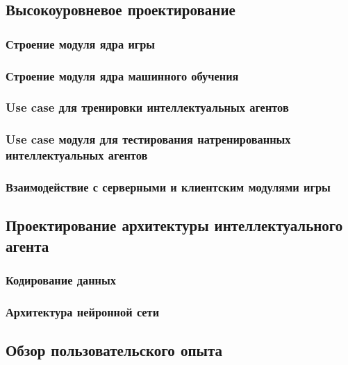 \documentclass{vsureport}
\begin{document}
\subsection{Высокоуровневое проектирование}


\subsubsection{Строение модуля ядра игры}


\subsubsection{Строение модуля ядра машинного обучения}


\subsubsection{Use case для тренировки интеллектуальных агентов}


\subsubsection{Use case модуля для тестирования натренированных интеллектуальных агентов}


\subsubsection{Взаимодействие с серверными и клиентским модулями игры}


\subsection{Проектирование архитектуры интеллектуального агента}


\subsubsection{Кодирование данных}


\subsubsection{Архитектура нейронной сети}


\subsection{Обзор пользовательского опыта}

\end{document}

